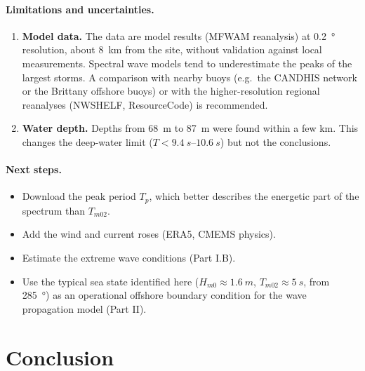 \documentclass[11pt,a4paper]{article}
\newcommand{\Hs}{H_{m0}}
\newcommand{\Tm}{T_{m02}}
\begin{document}
\paragraph{Limitations and uncertainties.}
\begin{enumerate}
  \item \textbf{Model data.} The data are model results (MFWAM reanalysis) at \SI{0.2}{\degree} resolution, about \SI{8}{km} from the site, without validation against local measurements. Spectral wave models tend to underestimate the peaks of the largest storms. A comparison with nearby buoys (e.g.\ the CANDHIS network or the Brittany offshore buoys) or with the higher-resolution regional reanalyses (NWSHELF, ResourceCode) is recommended.
  \item \textbf{Water depth.} Depths from \SI{68}{m} to \SI{87}{m} were found within a few km. This changes the deep-water limit ($T<\SIrange{9.4}{10.6}{s}$) but not the conclusions.
\end{enumerate}

\paragraph{Next steps.}
\begin{itemize}
  \item Download the peak period $T_p$, which better describes the energetic part of the spectrum than $\Tm$.
  \item Add the wind and current roses (ERA5, CMEMS physics).
  \item Estimate the extreme wave conditions (Part I.B).
  \item Use the typical sea state identified here ($\Hs\approx\SI{1.6}{m}$, $\Tm\approx\SI{5}{s}$, from \SI{285}{\degree}) as an operational offshore boundary condition for the wave propagation model (Part II).
\end{itemize}

\section{Conclusion}
\end{document}

